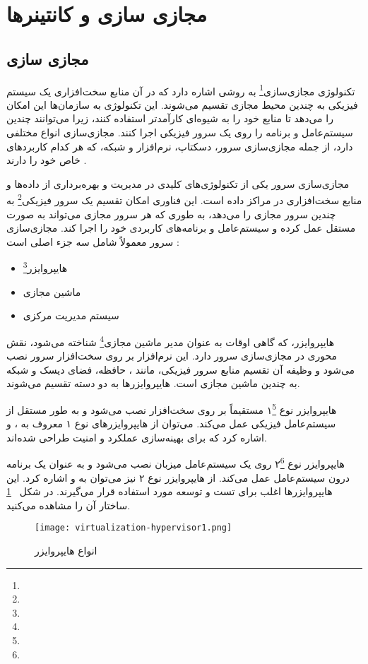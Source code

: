 \section{مجازی سازی و کانتینرها}
\subsection{مجازی سازی}
تکنولوژی مجازی‌سازی\footnote{} به روشی اشاره دارد که در آن منابع سخت‌افزاری یک سیستم فیزیکی به چندین محیط مجازی تقسیم می‌شوند. این تکنولوژی به سازمان‌ها این امکان را می‌دهد تا منابع خود را به شیوه‌ای کارآمدتر استفاده کنند، زیرا می‌توانند چندین سیستم‌عامل و برنامه را روی یک سرور فیزیکی اجرا کنند. مجازی‌سازی انواع مختلفی دارد، از جمله مجازی‌سازی سرور، دسکتاپ، نرم‌افزار و شبکه، که هر کدام کاربردهای خاص خود را دارند \cite{virtualization1, virtualization2}.

مجازی‌سازی سرور یکی از تکنولوژی‌های کلیدی در مدیریت و بهره‌برداری از داده‌ها و منابع سخت‌افزاری در مراکز داده است. این فناوری امکان تقسیم یک سرور فیزیکی\footnote{} به چندین سرور مجازی را می‌دهد، به طوری که هر سرور مجازی می‌تواند به صورت مستقل عمل کرده و سیستم‌عامل و برنامه‌های کاربردی خود را اجرا کند. مجازی‌سازی سرور معمولاً شامل سه جزء اصلی است \cite{virtualization1}:
\begin{itemize}
	\item 
	هایپروایزر\footnote{}
	\item
	ماشین مجازی
	\item 
	سیستم مدیریت مرکزی
\end{itemize}

هایپروایزر، که گاهی اوقات به عنوان مدیر ماشین مجازی\footnote{} شناخته می‌شود، نقش محوری در مجازی‌سازی سرور دارد. این نرم‌افزار بر روی سخت‌افزار سرور نصب می‌شود و وظیفه آن تقسیم منابع سرور فیزیکی، مانند ، حافظه، فضای دیسک و شبکه به چندین ماشین مجازی است. هایپروایزرها به دو دسته تقسیم می‌شوند.

هایپروایزر نوع ۱\footnote{} مستقیماً بر روی سخت‌افزار نصب می‌شود و به طور مستقل از سیستم‌عامل فیزیکی عمل می‌کند. می‌توان از هایپروایزرهای نوع ۱ معروف به ، و  اشاره کرد که برای بهینه‌سازی عملکرد و امنیت طراحی شده‌اند.

هایپروایزر نوع ۲\footnote{} روی یک سیستم‌عامل میزبان نصب می‌شود و به عنوان یک برنامه درون سیستم‌عامل عمل می‌کند. از هایپروایزر نوع ۲ نیز می‌توان به  و  اشاره کرد. این هایپروایزرها اغلب برای تست و توسعه مورد استفاده قرار می‌گیرند. در شکل 
~\ref{fig: hypervisors types} 
ساختار آن را مشاهده می‌کنید.
\begin{figure}[t]
	\centering
	\texttt{[image: virtualization-hypervisor1.png]}
	\caption{انواع هایپروایزر \cite{virtualization1}}
	\label{fig: hypervisors types}
\end{figure}


